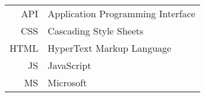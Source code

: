 \begin{longtable}{rl}
API & Application Programming Interface\\
CSS & Cascading Style Sheets\\
HTML & HyperText Markup Language\\
JS & JavaScript\\
MS & Microsoft\\

\end{longtable}
